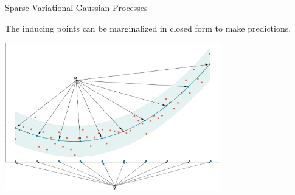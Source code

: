 \documentclass[aspectratio=149]{beamer}
\begin{document}
    \begin{frame}{Sparse Variational Gaussian Processes}
    \begin{center}
    The inducing points can be marginalized in closed form to make predictions.
    \end{center}
    
    \begin{center}
        \includegraphics[width=0.7\textwidth]{slides_imgs/GP_inducing_3.pdf}
    \end{center}
    \end{frame}
\end{document}
